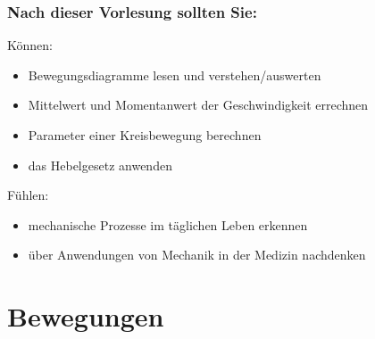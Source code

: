 \documentclass{beamer}
\begin{document}
\begin{frame}

\frametitle{Nach dieser Vorlesung sollten Sie:}
 



\begin{block}{Können:}
\begin{itemize}
\item
Bewegungsdiagramme lesen und verstehen/auswerten
\item
Mittelwert und Momentanwert der Geschwindigkeit errechnen
\item
Parameter einer Kreisbewegung berechnen
\item 
das Hebelgesetz anwenden
\end{itemize}
\end{block}


 
\begin{block}{Fühlen:}
\begin{itemize}
\item
mechanische Prozesse im täglichen Leben erkennen
\item
über Anwendungen von Mechanik in der Medizin nachdenken
\end{itemize}
\end{block}

 \end{frame}



\section{Bewegungen} 


\begin{frame}
\end{frame}
\end{document}
